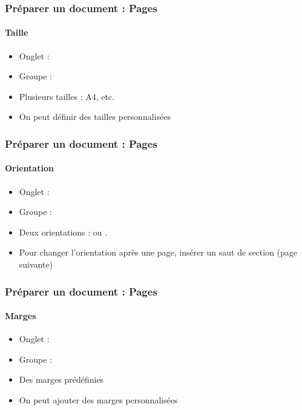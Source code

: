 \documentclass[xcolor=table]{beamer}
\begin{document}
\begin{frame}[t]
\frametitle{Préparer un document : Pages}
\framesubtitle{Taille}

\begin{minipage}{0.44\textwidth}
	\begin{itemize}
		\item Onglet : 
		\item Groupe : 
		\item Plusieurs tailles : A4, etc.
		\item On peut définir des tailles personnalisées
	\end{itemize}
\end{minipage}
\begin{minipage}{0.55\textwidth}
\end{minipage}

\end{frame}


\begin{frame}[t]
\frametitle{Préparer un document : Pages}
\framesubtitle{Orientation}

\begin{minipage}{0.44\textwidth}
	\begin{itemize}
		\item Onglet : 
		\item Groupe : 
		\item Deux orientations :  ou .
		\item Pour changer l'orientation après une page, insérer un saut de section (page suivante)
	\end{itemize}
\end{minipage}
\begin{minipage}{0.55\textwidth}
	\vspace{1cm}%
\end{minipage}

\end{frame}

\begin{frame}[t]
\frametitle{Préparer un document : Pages}
\framesubtitle{Marges}

\begin{minipage}{0.44\textwidth}
	\begin{itemize}
		\item Onglet : 
		\item Groupe : 
		\item Des marges prédéfinies
		\item On peut ajouter des marges personnalisées
	\end{itemize}
\end{minipage}
\begin{minipage}{0.55\textwidth}
\end{minipage}

\end{frame}
\end{document}
